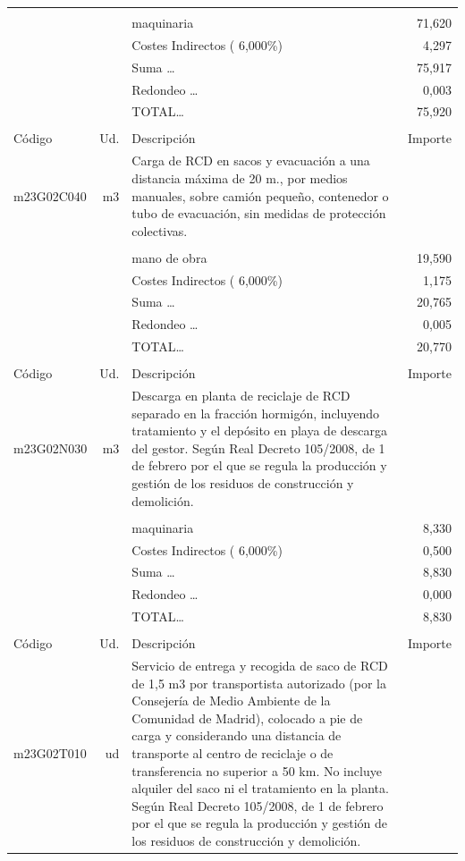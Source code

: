 \begin{supertabular}{l r p{60mm} r}
&&&\\%
&&maquinaria&    71,620\\%
&&Costes Indirectos (     6,000\%)&     4,297\\%
&&Suma \ldots&    75,917\\%
&&Redondeo \ldots&     0,003\\%
%
&&TOTAL\ldots&    75,920\\%
&&&\\%
Código&Ud.&Descripción&Importe\\%
\hline%
m23G02C040&m3&Carga de RCD en sacos y evacuación a una distancia máxima de 20 m., por medios manuales, sobre camión pequeño, contenedor o tubo de evacuación, sin medidas de protección colectivas.&\\%
&&&\\%
&&mano de obra&    19,590\\%
&&Costes Indirectos (     6,000\%)&     1,175\\%
&&Suma \ldots&    20,765\\%
&&Redondeo \ldots&     0,005\\%
%
&&TOTAL\ldots&    20,770\\%
&&&\\%
Código&Ud.&Descripción&Importe\\%
\hline%
m23G02N030&m3&Descarga en planta de reciclaje de RCD separado en la fracción hormigón, incluyendo tratamiento y el depósito en playa de descarga del gestor. Según Real Decreto 105/2008, de 1 de febrero por el que se regula la producción y gestión de los residuos de construcción y demolición.&\\%
&&&\\%
&&maquinaria&     8,330\\%
&&Costes Indirectos (     6,000\%)&     0,500\\%
&&Suma \ldots&     8,830\\%
&&Redondeo \ldots&     0,000\\%
%
&&TOTAL\ldots&     8,830\\%
&&&\\%
Código&Ud.&Descripción&Importe\\%
\hline%
m23G02T010&ud&Servicio de entrega y recogida de saco de RCD de 1,5 m3 por transportista autorizado (por la Consejería de Medio Ambiente de la Comunidad de Madrid), colocado a pie de carga y considerando una distancia de transporte al centro de reciclaje o de transferencia no superior a 50 km. No incluye alquiler del saco ni el tratamiento en la planta. Según Real Decreto 105/2008, de 1 de febrero por el que se regula la producción y gestión de los residuos de construcción y demolición.&\\%

\end{supertabular}
